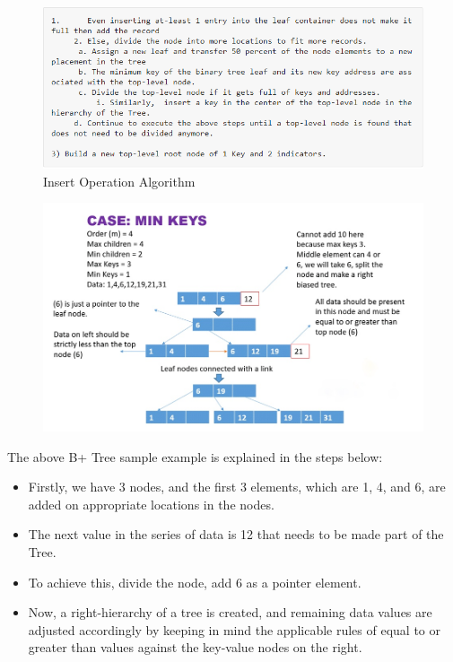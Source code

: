 \documentclass[11pt, a4paper]{article}
\begin{document}
\begin{figure}[h]
    \centering
    \includegraphics[scale=0.5]{insert.png}
    \caption{Insert Operation Algorithm}
    \label{insert}
\end{figure}



\begin{figure}[h]
    \centering
    \includegraphics[scale=0.5]{insert1.jpeg}
    \label{insert}
\end{figure}

\noindent The above B+ Tree sample example is explained in the steps below:

\begin{itemize}
    \item Firstly, we have 3 nodes, and the first 3 elements, which are 1, 4, and 6, are added on appropriate locations in the nodes.
    \item The next value in the series of data is 12 that needs to be made part of the Tree.
    \item To achieve this, divide the node, add 6 as a pointer element.
    \item Now, a right-hierarchy of a tree is created, and remaining data values are adjusted accordingly by keeping in mind the applicable rules of equal to or greater than values against the key-value nodes on the right.
\end{itemize}
\end{document}
